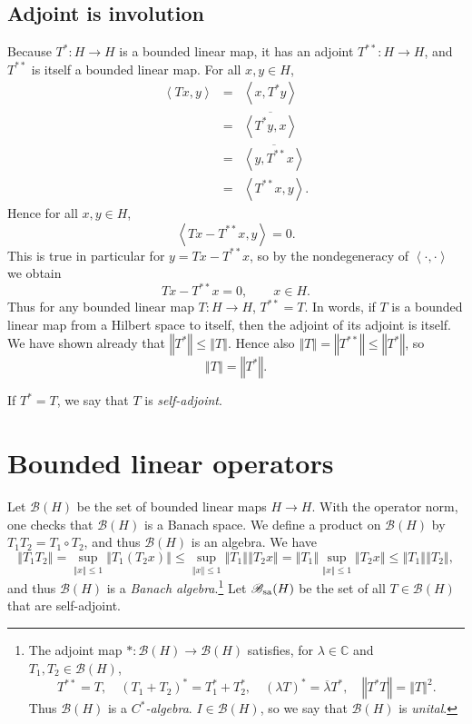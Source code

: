 \documentclass{article}
\newcommand{\inner}[2]{\left\langle #1, #2 \right\rangle}
\newcommand{\SA}{\mathscr{B}_{\ensuremath\mathrm{sa}}(H)}
\newcommand{\norm}[1]{\left\Vert #1 \right\Vert}
\begin{document}
\subsection{Adjoint is involution}
Because $T^*:H \to H$ is a bounded linear map, it has an adjoint $T^{**}:H \to H$, and $T^{**}$ is itself a bounded
linear map. For all $x, y \in H$,
\begin{eqnarray*}
\inner{Tx}{y}&=&\inner{x}{T^* y}\\
&=&\overline{\inner{T^* y}{x}}\\
&=&\overline{\inner{y}{T^{**}x}}\\
&=&\inner{T^{**}x}{y}.
\end{eqnarray*}
Hence for all $x, y \in H$,
\[
\inner{Tx-T^{**}x}{y}=0.
\]
This is true in particular for $y=Tx-T^{**}x$, so by the nondegeneracy of $\inner{\cdot}{\cdot}$
we obtain
\[
Tx-T^{**}x=0, \qquad x \in H.
\]
Thus for any bounded linear map $T:H \to H$, $T^{**}=T$. In words, if $T$ is a bounded linear map from a Hilbert space to itself,
then the adjoint of its adjoint is itself.
We have shown already that $\norm{T^*} \leq \norm{T}$. Hence also $\norm{T}= \norm{T^{**}} \leq \norm{T^*}$, so
\[
\norm{T}=\norm{T^*}.
\]

If $T^*=T$, we say that $T$ is {\em self-adjoint}. 



\section{Bounded linear operators}
Let $\mathscr{B}(H)$ be the set of bounded linear maps $H \to H$. With the operator norm, one checks that $\mathscr{B}(H)$ is a Banach space. We define a product on $\mathscr{B}(H)$ by
$T_1T_2 = T_1 \circ T_2$, and thus $\mathscr{B}(H)$ is an algebra. We have 
\[
\norm{T_1 T_2} = \sup_{\norm{x} \leq 1} \norm{T_1 ( T_2 x)} \leq \sup_{\norm{x} \leq 1} \norm{T_1} \norm{T_2 x} 
= \norm{T_1}  \sup_{\norm{x} \leq 1} \norm{T_2 x} \leq \norm{T_1} \norm{T_2},
\]
and thus $\mathscr{B}(H)$ is a {\em Banach algebra}.\footnote{The adjoint map $*:\mathscr{B}(H) \to \mathscr{B}(H)$ satisfies, for $\lambda \in \mathbb{C}$ and
$T_1,T_2 \in \mathscr{B}(H)$, 
\[
T^{**}=T,\quad (T_1+T_2)^*=T_1^*+T_2^*, \quad (\lambda T)^*=\overline{\lambda} T^*, \quad \norm{T^* T}=\norm{T}^2.
\]
Thus $\mathscr{B}(H)$ is a {\em $C^*$-algebra}. $I \in \mathscr{B}(H)$, so we say that $\mathscr{B}(H)$ is {\em unital}.}
Let $\SA$ be the set of all $T \in \mathscr{B}(H)$ that are self-adjoint.
\end{document}
